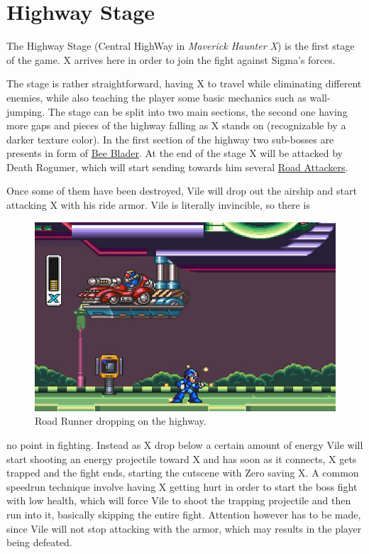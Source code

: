 \section{Highway Stage}
The Highway Stage (Central HighWay in \textit{Maverick Haunter X}) is the first stage of the game. X arrives here in order to join the fight against Sigma's forces.


 The stage is rather straightforward, having X to travel while eliminating different enemies, while also teaching the player some basic mechanics such as wall-jumping.  The stage can be split into two main sections\cite{stratwiki:HighWay}, the second one having more gaps and pieces of the highway falling as X stands on (recognizable by a darker texture color). In the first section of the highway two sub-bosses are presents in form of \hyperlink{miniboss:Bee_Blader}{Bee Blader}. At the end of the stage X will be attacked by Death Rogumer, which will start sending towards him several \hyperlink{enem:Road_Attackers}{Road Attackers}.

 
 Once some of them have been destroyed, Vile will drop out the airship and start attacking X with his ride armor. Vile is literally invincible, so there is 
 \begin{figure}
 	\vspace{-10pt}
 	\centering
 	\includegraphics[width=0.9\linewidth]{figures/X1/Highway_screenshot_2.jpg}
 	\caption{Road Runner dropping on the highway.}
 \end{figure}
 no point in fighting. Instead as X drop below a certain amount of energy Vile will start shooting an energy projectile toward X and has soon as it connects, X gets trapped and the fight ends, starting the cutscene with Zero saving X. A common speedrun  technique involve having X getting hurt in order to start the boss fight with low health, which will force Vile to shoot the trapping projectile and then run into it, basically skipping the entire fight.  Attention however has to be made, since Vile will not stop attacking with the armor, which may results in the player being defeated.
 
